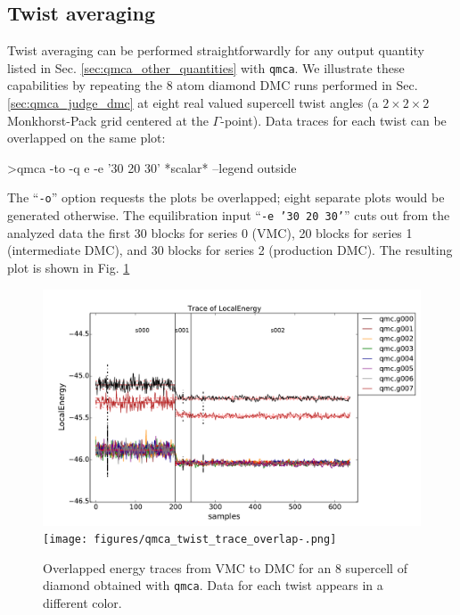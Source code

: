 \subsection{Twist averaging}
\label{sec:qmca_twist_average}
Twist averaging can be performed straightforwardly for any 
output quantity listed in Sec. \ref{sec:qmca_other_quantities} 
with \texttt{qmca}.  We illustrate these capabilities by 
repeating the 8 atom diamond DMC runs performed in Sec. 
\ref{sec:qmca_judge_dmc} at eight real valued supercell twist 
angles (a $2\times 2\times 2$ Monkhorst-Pack grid centered at 
the $\Gamma$-point).  Data traces for each twist can be overlapped 
on the same plot:
\begin{shade}
>qmca -to -q e -e '30 20 30' *scalar* --legend outside
\end{shade}
\noindent
The ``\texttt{-o}'' option requests the plots be overlapped; 
eight separate plots would be generated otherwise.  The 
equilibration input ``\texttt{-e '30 20 30'}'' cuts out from 
the analyzed data the first 30 blocks for series 0 (VMC), 
20 blocks for series 1 (intermediate DMC), and 30 blocks for 
series 2 (production DMC).  The resulting plot is shown in 
Fig. \ref{fig:qmca_twist_overlap}

\begin{figure}
\begin{center}
\ifpdf
\includegraphics[trim = 0mm 0mm 0mm 0mm, clip,width=0.9\columnwidth]{figures/qmca_twist_trace_overlap.pdf}
\else
\texttt{[image: figures/qmca\_twist\_trace\_overlap-.png]}
\fi
\end{center}
\caption{Overlapped energy traces from VMC to DMC for an 8 supercell of diamond obtained with \texttt{qmca}.  Data for each twist appears in a different color.}
\label{fig:qmca_twist_overlap}
\end{figure}

